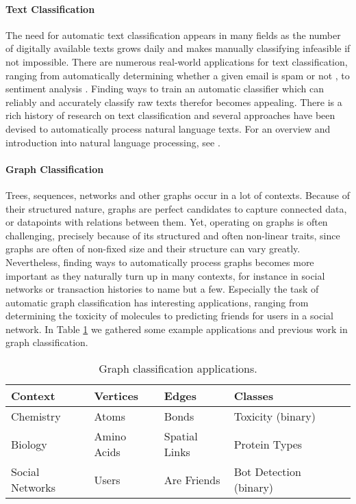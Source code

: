 \paragraph{Text Classification}
The need for automatic text classification appears in many fields as the number of digitally available texts grows daily and makes manually classifying infeasible if not impossible.
There are numerous real-world applications for text classification, ranging from automatically determining whether a given email is spam or not \cite{Yu2008}, to sentiment analysis \cite{Liu2012}.
Finding ways to train an automatic classifier which can reliably and accurately classify raw texts therefor becomes appealing.
There is a rich history of research on text classification and several approaches have been devised to automatically process natural language texts.
For an overview and introduction into natural language processing, see \cite{Manning2000}.

\paragraph{Graph Classification}
Trees, sequences, networks and other graphs occur in a lot of contexts.
Because of their structured nature, graphs are perfect candidates to capture connected data, or datapoints with relations between them.
Yet, operating on graphs is often challenging, precisely because of its structured and often non-linear traits, since graphs are often of non-fixed size and their structure can vary greatly.
Nevertheless, finding ways to automatically process graphs becomes more important as they naturally turn up in many contexts, for instance in social networks or transaction histories to name but a few.
Especially the task of automatic graph classification has interesting applications, ranging from determining the toxicity of molecules to predicting friends for users in a social network.
In Table \ref{table:graph_classification_examples} we gathered some example applications and previous work in graph classification.

\begin{table}[htb!]
\centering
\renewcommand*{\arraystretch}{0.95}
\begin{tabular}{llllr}
Context & Vertices & Edges & Classes &  \\
\midrule
Chemistry & Atoms & Bonds & Toxicity (binary) & \cite{Mahe2005} \\
Biology & Amino Acids & Spatial Links & Protein Types & \cite{Vazquez2008} \\ 
Social Networks & Users & Are Friends & Bot Detection (binary) & \cite{Wang2014} \\
\bottomrule
\end{tabular}%
\caption[Table: Graph Classification Applications]{Graph classification applications.}%
\label{table:graph_classification_examples}
\end{table}

